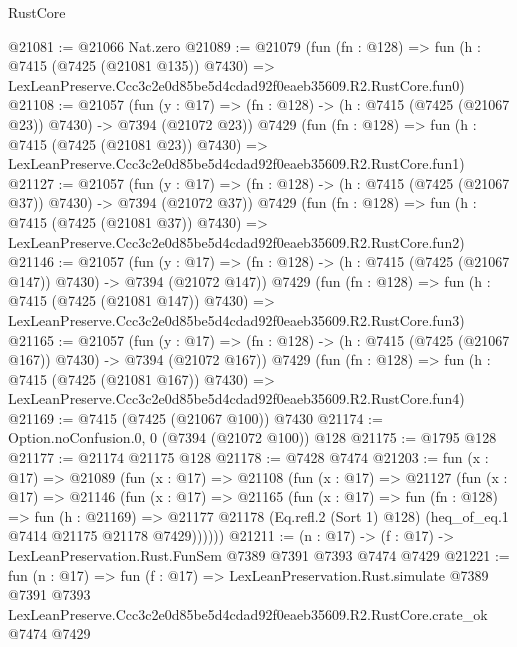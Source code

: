 \begin{lexlean}{RustCore}
\begin{coremodule}
@21081 := @21066 Nat.zero
@21089 := @21079
    (fun (fn : @128) =>
    fun (h : @7415 (@7425 (@21081 @135)) @7430) =>
    LexLeanPreserve.Ccc3c2e0d85be5d4cdad92f0eaeb35609.R2.RustCore.fun0)
@21108 := @21057
    (fun (y : @17) => (fn : @128) -> (h : @7415 (@7425 (@21067 @23)) @7430) -> @7394 (@21072 @23))
    @7429
    (fun (fn : @128) =>
    fun (h : @7415 (@7425 (@21081 @23)) @7430) =>
    LexLeanPreserve.Ccc3c2e0d85be5d4cdad92f0eaeb35609.R2.RustCore.fun1)
@21127 := @21057
    (fun (y : @17) => (fn : @128) -> (h : @7415 (@7425 (@21067 @37)) @7430) -> @7394 (@21072 @37))
    @7429
    (fun (fn : @128) =>
    fun (h : @7415 (@7425 (@21081 @37)) @7430) =>
    LexLeanPreserve.Ccc3c2e0d85be5d4cdad92f0eaeb35609.R2.RustCore.fun2)
@21146 := @21057
    (fun (y : @17) => (fn : @128) -> (h : @7415 (@7425 (@21067 @147)) @7430) -> @7394 (@21072 @147))
    @7429
    (fun (fn : @128) =>
    fun (h : @7415 (@7425 (@21081 @147)) @7430) =>
    LexLeanPreserve.Ccc3c2e0d85be5d4cdad92f0eaeb35609.R2.RustCore.fun3)
@21165 := @21057
    (fun (y : @17) => (fn : @128) -> (h : @7415 (@7425 (@21067 @167)) @7430) -> @7394 (@21072 @167))
    @7429
    (fun (fn : @128) =>
    fun (h : @7415 (@7425 (@21081 @167)) @7430) =>
    LexLeanPreserve.Ccc3c2e0d85be5d4cdad92f0eaeb35609.R2.RustCore.fun4)
@21169 := @7415 (@7425 (@21067 @100)) @7430
@21174 := Option.noConfusion.{0, 0} (@7394 (@21072 @100)) @128
@21175 := @1795 @128
@21177 := @21174 @21175 @128
@21178 := @7428 @7474
@21203 := fun (x : @17) =>
  @21089
    (fun (x : @17) =>
    @21108
      (fun (x : @17) =>
      @21127
        (fun (x : @17) =>
        @21146
          (fun (x : @17) =>
          @21165
            (fun (x : @17) =>
            fun (fn : @128) =>
            fun (h : @21169) =>
            @21177 @21178 (Eq.refl.{2} (Sort 1) @128) (heq_of_eq.{1} @7414 @21175 @21178 @7429))))))
@21211 := (n : @17) -> (f : @17) -> LexLeanPreservation.Rust.FunSem @7389 @7391 @7393 @7474 @7429
@21221 := fun (n : @17) =>
  fun (f : @17) =>
  LexLeanPreservation.Rust.simulate
    @7389
    @7391
    @7393
    LexLeanPreserve.Ccc3c2e0d85be5d4cdad92f0eaeb35609.R2.RustCore.crate_ok
    @7474
    @7429
\end{coremodule}
\end{lexlean}
